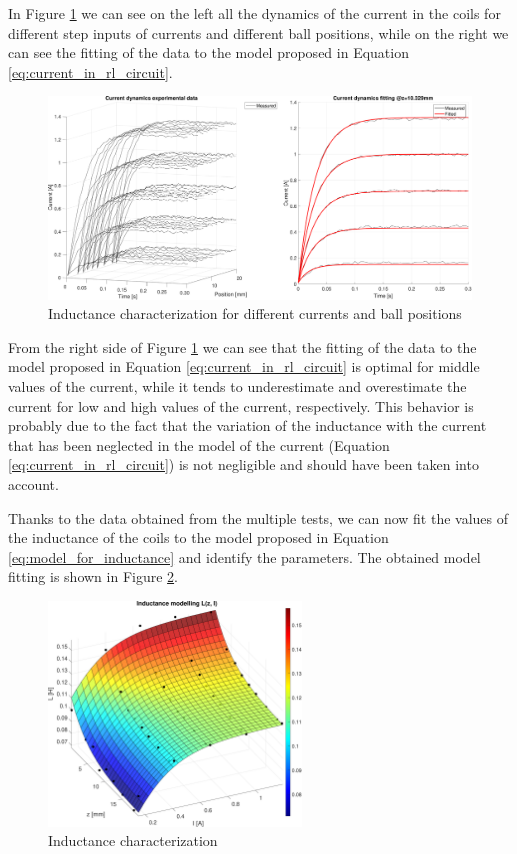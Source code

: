 In Figure \ref{fig:inductance_characterization_currents} we can see on the left all the dynamics of the current in the coils for different step inputs of currents and different ball positions, while on the right we can see the fitting of the data to the model proposed in Equation \ref{eq:current_in_rl_circuit}.

\begin{figure}[H]
    \centering
    \includegraphics[width=1\textwidth]{img/MATLAB/measurements/currents.pdf}
    \caption{Inductance characterization for different currents and ball positions}
    \label{fig:inductance_characterization_currents}
\end{figure}

From the right side of Figure \ref{fig:inductance_characterization_currents} we can see that the fitting of the data to the model proposed in Equation \ref{eq:current_in_rl_circuit} is optimal for middle values of the current, while it tends to underestimate and overestimate the current for low and high values of the current, respectively.
This behavior is probably due to the fact that the variation of the inductance with the current that has been neglected in the model of the current (Equation \ref{eq:current_in_rl_circuit}) is not negligible and should have been taken into account.

Thanks to the data obtained from the multiple tests, we can now fit the values of the inductance of the coils to the model proposed in Equation \ref{eq:model_for_inductance} and identify the parameters.
The obtained model fitting is shown in Figure \ref{fig:inductance_characterization_inductance}.

\begin{figure}[H]
    \centering
    \includegraphics[width=0.6\textwidth]{img/MATLAB/measurements/inductance.pdf}
    \caption{Inductance characterization}
    \label{fig:inductance_characterization_inductance}
\end{figure}

